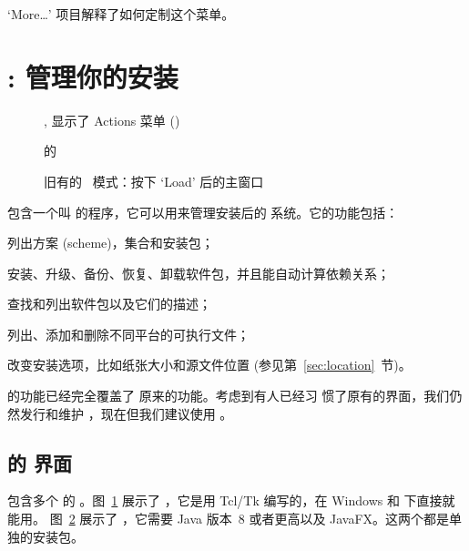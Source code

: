 \documentclass{article}
\begin{document}
\medskip
{}
\smallskip

\noindent `More\ldots' 项目解释了如何定制这个菜单。

\section{: 管理你的安装}
\label{sec:tlmgr}


\begin{figure}[tb]
  \caption{ \GUI, 显示了 Actions 菜单 (\MacOSX)}
  \label{fig:tlshell}
\end{figure}

\begin{figure}[tb]
  \caption{ 的  \GUI{}}
  \label{fig:tlcockpit}
\end{figure}

\begin{figure}[tb]
  \caption{旧有的  \GUI\ 模式：按下 `Load' 后的主窗口}
  \label{fig:tlmgr-gui}
\end{figure}

\TL{} 包含一个叫  的程序，它可以用来管理安装后的
系统。它的功能包括：

\begin{itemize*}
  \item 列出方案 (scheme)，集合和安装包；
  \item 安装、升级、备份、恢复、卸载软件包，并且能自动计算依赖关系；
  \item 查找和列出软件包以及它们的描述；
  \item 列出、添加和删除不同平台的可执行文件；
  \item 改变安装选项，比如纸张大小和源文件位置 (参见第~\ref{sec:location}~节)。
\end{itemize*}

 的功能已经完全覆盖了  原来的功能。考虑到有人已经习
惯了原有的界面，我们仍然发行和维护 ，现在但我们建议使用
。

\subsection{ 的 \GUI{} 界面}

\TL{} 包含多个  的 \GUI{}。图~\ref{fig:tlshell} 展示了
，它是用 Tcl/Tk 编写的，在 Windows 和 \MacOSX{} 下直接就能用。
图~\ref{fig:tlcockpit} 展示了 ，它需要 Java 版本~8 或者更高以及
JavaFX。这两个都是单独的安装包。
\end{document}
